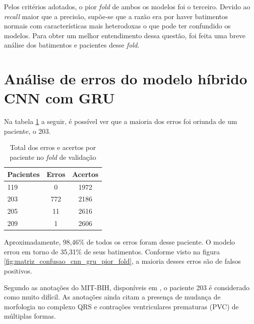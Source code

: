 Pelos critérios adotados, o pior \textit{fold} de ambos os modelos foi o terceiro. Devido ao \textit{recall} maior que a precisão, supõe-se que 
a razão era por haver batimentos normais com características mais heterodoxas o que pode ter confundido os modelos. Para obter um melhor entendimento
dessa questão, foi feita uma breve análise dos batimentos e pacientes desse \textit{fold}. 

\section{Análise de erros do modelo híbrido CNN com GRU}
\label{sec:analise_erros_cnn_gru}

Na tabela \ref{tab:erros_acertos_por_paciente} a seguir, é possível ver que a maioria dos erros foi oriunda de um paciente, o 203.

\begin{table}[H]
\centering
\caption{Total dos erros e acertos por paciente no \textit{fold} de validação}
\label{tab:erros_acertos_por_paciente}
\begin{tabular}{lcc}
\hline
\textbf{Pacientes} & \textbf{Erros} & \textbf{Acertos}\\
\hline
119 & 0 &  1972 \\
203 & 772  & 2186\\
205 & 11 & 2616\\
209 & 1 & 2606\\
\hline
\end{tabular}
\end{table}

Aproximadamente, 98,46\% de todos os erros foram desse paciente. O modelo errou em torno de 35,31\% de seus batimentos. Conforme visto na 
figura \ref{fig:matriz_confusao_cnn_gru_pior_fold}, a maioria desses erros são de falsos positivos.

Segundo as anotações do MIT-BIH, disponíveis em \cite{physionet_annotations}, o paciente 203 é considerado como muito difícil. As anotações ainda citam
a presença de mudança de morfologia no complexo QRS e contrações ventriculares prematuras (PVC) de múltiplas formas.